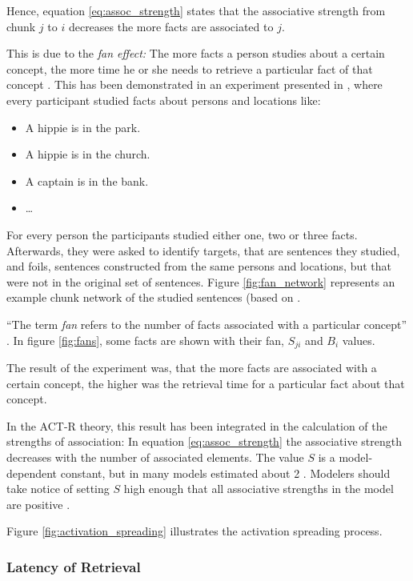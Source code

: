 Hence, equation \eqref{eq:assoc_strength} states that the associative strength from chunk $j$ to $i$ decreases the more facts are associated to $j$.

This is due to the \emph{fan effect:} The more facts a person studies about a certain concept, the more time he or she needs to retrieve a particular fact of that concept \cite[p. 186]{anderson_fan_1999}. This has been demonstrated in an experiment presented in \cite{anderson_fan_1999}, where every participant studied facts about persons and locations like:

\begin{itemize}
 \item A hippie is in the park.
 \item A hippie is in the church.
 \item A captain is in the bank.
 \item \dots
\end{itemize}

For every person the participants studied either one, two or three facts. Afterwards, they were asked to identify targets, that are sentences they studied, and foils, sentences constructed from the same persons and locations, but that were not in the original set of sentences. Figure \ref{fig:fan_network} represents an example chunk network of the studied sentences (based on \cite[fig. 1]{anderson_fan_1999}.

``The term \emph{fan} refers to the number of facts associated with a particular concept'' \cite[p. 186]{anderson_fan_1999}. In figure \ref{fig:fans}, some facts are shown with their fan, $S_{ji}$ and $B_i$ values.

The result of the experiment was, that the more facts are associated with a certain concept, the higher was the retrieval time for a particular fact about that concept.

In the ACT-R theory, this result has been integrated in the calculation of the strengths of association: In equation \eqref{eq:assoc_strength} the associative strength decreases with the number of associated elements. The value $S$ is a model-dependent constant, but in many models estimated about 2 \cite[p. 1042]{anderson_integrated_2004}. Modelers should take notice of setting $S$ high enough that all associative strengths in the model are positive \cite[unit 5, p. 3]{actr_tutorial}.

Figure \ref{fig:activation_spreading} illustrates the activation spreading process.

\subsubsection{Latency of Retrieval}

